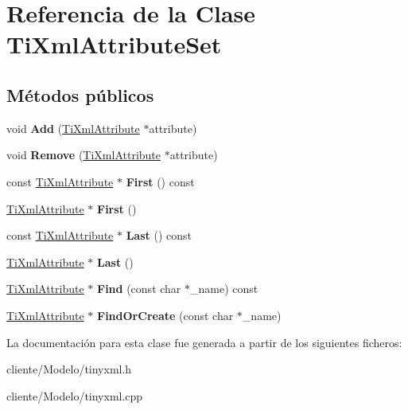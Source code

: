 \hypertarget{classTiXmlAttributeSet}{\section{\-Referencia de la \-Clase \-Ti\-Xml\-Attribute\-Set}
\label{classTiXmlAttributeSet}
}
\subsection*{\-Métodos públicos}
\begin{DoxyCompactItemize}
\item 
\hypertarget{classTiXmlAttributeSet_a745e50ddaae3bee93e4589321e0b9c1a}{void {\bfseries \-Add} (\hyperlink{classTiXmlAttribute}{\-Ti\-Xml\-Attribute} $\ast$attribute)}\label{classTiXmlAttributeSet_a745e50ddaae3bee93e4589321e0b9c1a}

\item 
\hypertarget{classTiXmlAttributeSet_a924a73d071f2573f9060f0be57879c57}{void {\bfseries \-Remove} (\hyperlink{classTiXmlAttribute}{\-Ti\-Xml\-Attribute} $\ast$attribute)}\label{classTiXmlAttributeSet_a924a73d071f2573f9060f0be57879c57}

\item 
\hypertarget{classTiXmlAttributeSet_ae0636e88cedd4b09d61c451860f68598}{const \hyperlink{classTiXmlAttribute}{\-Ti\-Xml\-Attribute} $\ast$ {\bfseries \-First} () const }\label{classTiXmlAttributeSet_ae0636e88cedd4b09d61c451860f68598}

\item 
\hypertarget{classTiXmlAttributeSet_a99703bb08ca2aece2d7ef835de339ba0}{\hyperlink{classTiXmlAttribute}{\-Ti\-Xml\-Attribute} $\ast$ {\bfseries \-First} ()}\label{classTiXmlAttributeSet_a99703bb08ca2aece2d7ef835de339ba0}

\item 
\hypertarget{classTiXmlAttributeSet_a7b3f3ccf39a97bc25539d3fcc540296a}{const \hyperlink{classTiXmlAttribute}{\-Ti\-Xml\-Attribute} $\ast$ {\bfseries \-Last} () const }\label{classTiXmlAttributeSet_a7b3f3ccf39a97bc25539d3fcc540296a}

\item 
\hypertarget{classTiXmlAttributeSet_ab4c4edfb2d74f6ea31aae096743bd6e0}{\hyperlink{classTiXmlAttribute}{\-Ti\-Xml\-Attribute} $\ast$ {\bfseries \-Last} ()}\label{classTiXmlAttributeSet_ab4c4edfb2d74f6ea31aae096743bd6e0}

\item 
\hypertarget{classTiXmlAttributeSet_af3675cc2bfd0aea153cda1cfcdd1f77e}{\hyperlink{classTiXmlAttribute}{\-Ti\-Xml\-Attribute} $\ast$ {\bfseries \-Find} (const char $\ast$\-\_\-name) const }\label{classTiXmlAttributeSet_af3675cc2bfd0aea153cda1cfcdd1f77e}

\item 
\hypertarget{classTiXmlAttributeSet_a5e28f5d32f048fba85d04dc317495bdc}{\hyperlink{classTiXmlAttribute}{\-Ti\-Xml\-Attribute} $\ast$ {\bfseries \-Find\-Or\-Create} (const char $\ast$\-\_\-name)}\label{classTiXmlAttributeSet_a5e28f5d32f048fba85d04dc317495bdc}

\end{DoxyCompactItemize}


\-La documentación para esta clase fue generada a partir de los siguientes ficheros\-:\begin{DoxyCompactItemize}
\item 
cliente/\-Modelo/tinyxml.\-h\item 
cliente/\-Modelo/tinyxml.\-cpp\end{DoxyCompactItemize}
